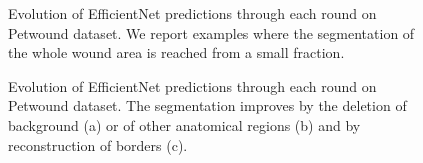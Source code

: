 \documentclass[../main.tex]{subfiles}
\begin{document}
\begin{figure}[H]
\centering
{}
\hspace{2cm}
\caption{Evolution of EfficientNet predictions through each round on Petwound dataset. We report examples where the segmentation of the whole wound area is reached from a small fraction.}
\label{fig:pet-visual-results1}
\end{figure}

\begin{figure}[H]
\centering
{}
\hspace{2cm}
\hspace{2cm}
\caption{Evolution of EfficientNet predictions through each round on Petwound dataset. The segmentation improves by the deletion of background (a) or of other anatomical regions (b) and by reconstruction of borders (c).}
\label{fig:pet-visual-results2}
\end{figure}
\end{document}
